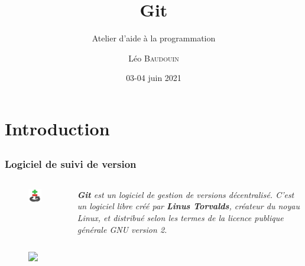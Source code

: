 \documentclass{beamer}
\title{Git}
\subtitle{Atelier d'aide à la programmation}
\author{L\'eo \textsc{Baudouin}}
\institute{
  {\url{baudouin.leo @ gmail.com}}
}
\date{03-04 juin 2021}
\begin{document}
\begin{frame}
  \titlepage
\end{frame}

\section{Introduction}

\subsection{}
\begin{frame}[label=git]
  \frametitle{Logiciel de suivi de version}
  \begin{columns}
    \begin{column}{0.2\linewidth}
      \begin{figure}
	\includegraphics[width=0.95\linewidth]{images/git-logo}  
      \end{figure}
    \end{column}
    \begin{column}{0.8\linewidth}  
      \textit{\textbf{Git} est un logiciel de gestion de versions décentralisé. C'est un logiciel libre créé par \textbf{Linus Torvalds}, créateur du noyau Linux, et distribué selon les termes de la licence publique générale GNU version 2.}
    \end{column}
  \end{columns}
  
  \begin{figure}
    \includegraphics<2>[width=0.95\linewidth]{images/github}  
  \end{figure}
  
\end{frame}
\end{document}
